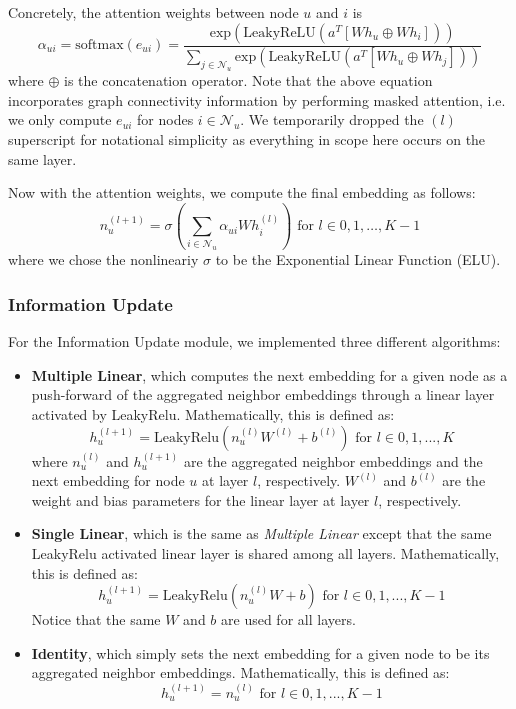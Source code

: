 \documentclass{article}
\begin{document}
\begin{itemize}
    Concretely, the attention weights between node $u$ and $i$ is $$\alpha_{ui} = \text{softmax} (e_{ui}) = \frac{\text{exp}(\text{LeakyReLU} (a^T [Wh_u \oplus Wh_i]) )}{\sum_{j\in \mathcal{N}_u}  \text{exp}(\text{LeakyReLU} (a^T [Wh_u \oplus Wh_j]) )}$$
    where $\oplus$ is the concatenation operator. Note that the above equation incorporates graph connectivity information by performing masked attention, i.e. we only compute $e_{ui}$ for nodes $i\in \mathcal{N}_u$. We temporarily dropped the ${(l)}$ superscript for notational simplicity as everything in scope here occurs on the same layer.

    Now with the attention weights, we compute the final embedding as follows: $$n_u^{(l + 1)} = \sigma ( \sum_{i\in \mathcal{N}_u} \alpha_{ui} W h_i^{(l)}  ) \text{ for } l \in 0, 1, \hdots, K - 1 $$ where we chose the nonlineariy $\sigma$ to be the Exponential Linear Function (ELU).
\end{itemize}

\subsubsection{Information Update} \label{info_update}

For the Information Update module, we implemented three different algorithms:
\begin{itemize}
    \item \textbf{Multiple Linear}, which computes the next embedding for a given node as a push-forward of the aggregated neighbor embeddings through a linear layer activated by LeakyRelu. Mathematically, this is defined as:
    $$
    h_u^{(l+1)} = \mbox{LeakyRelu}(n_u^{(l)} W^{(l)} + b^{(l)}) \text{ for } l \in 0, 1, ..., K
    $$
    where $n_u^{(l)}$ and $h_u^{(l+1)}$ are the aggregated neighbor embeddings and the next embedding for node $u$ at layer $l$, respectively. $W^{(l)}$ and $b^{(l)}$ are the weight and bias parameters for the linear layer at layer $l$, respectively.
    \item \textbf{Single Linear}, which is the same as \textit{Multiple Linear} except that the same LeakyRelu activated linear layer is shared among all layers. Mathematically, this is defined as:
    $$
    h_u^{(l+1)} = \mbox{LeakyRelu}(n_u^{(l)} W + b) \text{ for } l \in 0, 1, ..., K - 1
    $$
    Notice that the same $W$ and $b$ are used for all layers.
    \item \textbf{Identity}, which simply sets the next embedding for a given node to be its aggregated neighbor embeddings. Mathematically, this is defined as:
    $$
    h_u^{(l+1)} = n_u^{(l)} \text{ for } l \in 0, 1, ..., K - 1
    $$
\end{itemize}
\end{document}

